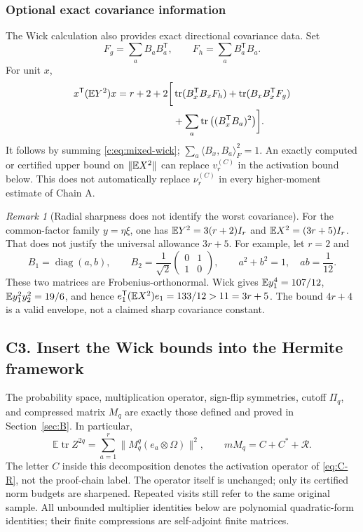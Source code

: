 \documentclass[11pt]{article}
\numberwithin{equation}{section}
\theoremstyle{definition}\newtheorem{definition}[theorem]{Definition}
\theoremstyle{remark}\newtheorem{remark}[theorem]{Remark}
\newcommand{\tr}{\operatorname{tr}}\newcommand{\Ent}{\operatorname{Ent}}
\newcommand{\norm}[1]{\lVert#1\rVert}\newcommand{\ip}[2]{\langle#1,#2\rangle}
\DeclareMathOperator{\diag}{diag}
\begin{document}
\subsubsection{Optional exact covariance information}\label{c:sec:exact-covariance}
The Wick calculation also provides exact directional covariance data. Set
\[
 F_g=\sum_aB_aB_a^{\mathsf T},\qquad F_h=\sum_aB_a^{\mathsf T}B_a.
\]
For unit $x$,
\begin{align}\label{c:eq:wick-exactcov}
 x^{\mathsf T}(\E Y^2)x
 =r+2+2\bigg[&\tr(B_x^{\mathsf T}B_xF_h)+\tr(B_xB_x^{\mathsf T}F_g)\notag\\
 &+\sum_a\tr\big((B_x^{\mathsf T}B_a)^2\big)\bigg].
\end{align}
It follows by summing \eqref{c:eq:mixed-wick}; $\sum_a\ip{B_x}{B_a}_F^2=1$.
An exactly computed or certified upper bound on $\norm{\E X^2}$ can replace $v_r^{(C)}$ in the activation bound below. This does not automatically replace $\nu_r^{(C)}$ in every higher-moment estimate of Chain A.

\begin{remark}[Radial sharpness does not identify the worst covariance]
For the common-factor family $y=\eta\xi$, one has $\mathbb E Y^2=3(r+2)I_r$ and $\mathbb E X^2=(3r+5)I_r$. That does not justify the universal allowance $3r+5$. For example, let $r=2$ and
\[
 B_1=\diag(a,b),\qquad B_2=\frac1{\sqrt2}\begin{pmatrix}0&1\\1&0\end{pmatrix},
 \qquad a^2+b^2=1,\quad ab=\frac1{12}.
\]
These two matrices are Frobenius-orthonormal. Wick gives
$\mathbb E y_1^4=107/12$, $\mathbb E y_1^2y_2^2=19/6$, and hence
$e_1^{\mathsf T}(\mathbb E X^2)e_1=133/12>11=3r+5$.
The bound $4r+4$ is a valid envelope, not a claimed sharp covariance constant.
\end{remark}


\subsection{C3. Insert the Wick bounds into the Hermite framework}
The probability space, multiplication operator, sign-flip symmetries, cutoff
$\Pi_q$, and compressed matrix $M_q$ are exactly those defined and proved in
Section~\ref{sec:B}. In particular,
\[
 \mathbb E\tr Z^{2q}=\sum_{a=1}^r\|M_q^q(e_a\otimes\Omega)\|^2,
 \qquad mM_q=C+C^*+\mathcal R.
\]
The letter $C$ inside this decomposition denotes the activation operator of
\eqref{eq:C-R}, not the proof-chain label. The operator itself is unchanged;
only its certified norm budgets are sharpened. Repeated visits still refer to
the same original sample. All unbounded multiplier identities below are
polynomial quadratic-form identities; their finite compressions are
self-adjoint finite matrices.
\end{document}
